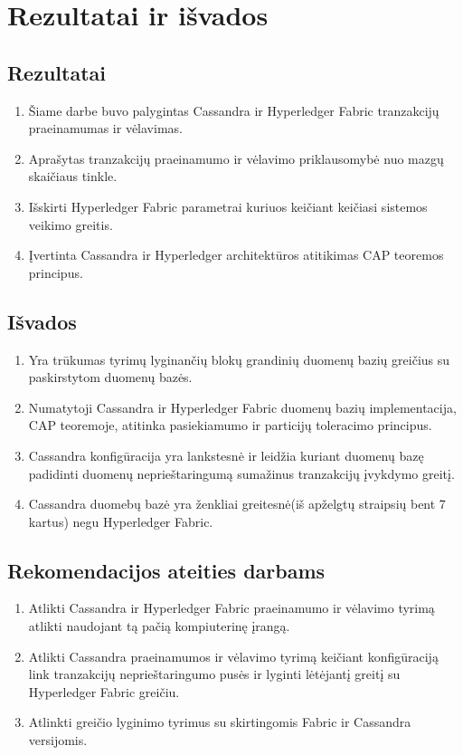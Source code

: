 \documentclass{VUMIFPSkursinis}
\begin{document}
\pagebreak
\section{Rezultatai ir išvados}
\thispagestyle{empty} 
	\subsection{Rezultatai}
		\begin{enumerate}
			\item{Šiame darbe buvo palygintas Cassandra ir Hyperledger Fabric tranzakcijų praeinamumas ir vėlavimas.}
			\item{Aprašytas tranzakcijų praeinamumo ir vėlavimo priklausomybė nuo mazgų skaičiaus tinkle.}
			\item{Išskirti Hyperledger Fabric parametrai kuriuos keičiant keičiasi sistemos veikimo greitis.}
			\item{Įvertinta Cassandra ir Hyperledger architektūros atitikimas CAP teoremos principus.}
		\end{enumerate}
	\subsection{Išvados}
		\begin{enumerate}
			\item{Yra trūkumas tyrimų lyginančių blokų grandinių duomenų bazių greičius su paskirstytom duomenų bazės.}
			\item{Numatytoji Cassandra ir Hyperledger Fabric duomenų bazių implementacija, CAP teoremoje, atitinka pasiekiamumo ir particijų toleracimo principus.}
			\item{Cassandra konfigūracija yra lankstesnė ir leidžia kuriant duomenų bazę padidinti duomenų neprieštaringumą sumažinus tranzakcijų įvykdymo greitį.}
			\item{Cassandra duomebų bazė yra ženkliai greitesnė(iš apželgtų straipsių bent 7 kartus) negu Hyperledger Fabric.}
		\end{enumerate}
	\subsection{Rekomendacijos ateities darbams}
		\begin{enumerate}
			\item{Atlikti Cassandra ir Hyperledger Fabric praeinamumo ir vėlavimo tyrimą atlikti naudojant tą pačią kompiuterinę įrangą.}
			\item{Atlikti Cassandra praeinamumos ir vėlavimo tyrimą keičiant konfigūraciją link tranzakcijų neprieštaringumo pusės ir lyginti lėtėjantį greitį su Hyperledger Fabric greičiu.}
			\item{Atlinkti greičio lyginimo tyrimus su skirtingomis Fabric ir Cassandra versijomis.}
		\end{enumerate}
\end{document}
